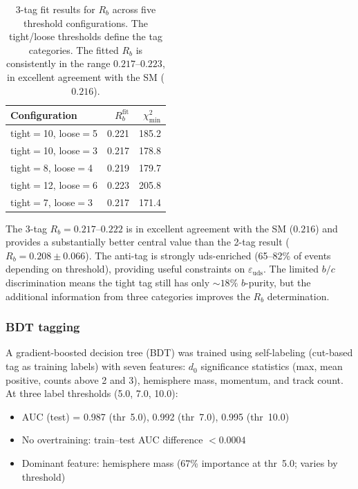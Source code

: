 \documentclass[11pt,a4paper]{article}
\begin{document}
\begin{table}[htbp]
\centering
\caption{3-tag fit results for $R_b$ across five threshold configurations. The
tight/loose thresholds define the tag categories. The fitted $R_b$ is consistently
in the range $0.217$--$0.223$, in excellent agreement with the SM ($0.216$).}
\label{tab:3tag_results}
\begin{tabular}{lrr}
\toprule
Configuration & $R_b^\mathrm{fit}$ & $\chi^2_\mathrm{min}$ \\
\midrule
tight$=$10, loose$=$5 & 0.221 & 185.2 \\
tight$=$10, loose$=$3 & 0.217 & 178.8 \\
tight$=$8, loose$=$4 & 0.219 & 179.7 \\
tight$=$12, loose$=$6 & 0.223 & 205.8 \\
tight$=$7, loose$=$3 & 0.217 & 171.4 \\
\bottomrule
\end{tabular}
\end{table}

The 3-tag $R_b = 0.217$--$0.222$ is in excellent agreement with the SM ($0.216$)
and provides a substantially better central value than the 2-tag result
($R_b = 0.208 \pm 0.066$). The anti-tag is strongly uds-enriched (65--82\% of events
depending on threshold), providing useful constraints on $\varepsilon_\mathrm{uds}$.
The limited $b/c$ discrimination means the tight tag still has only $\sim 18\%$
$b$-purity, but the additional information from three categories improves the
$R_b$ determination.

\subsubsection{BDT tagging}
\label{sec:postmortem_bdt}

A gradient-boosted decision tree (BDT) was trained using self-labeling (cut-based
tag as training labels) with seven features: $d_0$ significance statistics
(max, mean positive, counts above 2 and 3), hemisphere mass, momentum, and track count.
At three label thresholds (5.0, 7.0, 10.0):

\begin{itemize}
\item AUC (test) = 0.987 (thr~5.0), 0.992 (thr~7.0), 0.995 (thr~10.0)
\item No overtraining: train--test AUC difference $< 0.0004$
\item Dominant feature: hemisphere mass (67\% importance at thr~5.0; varies by threshold)
\end{itemize}
\end{document}
